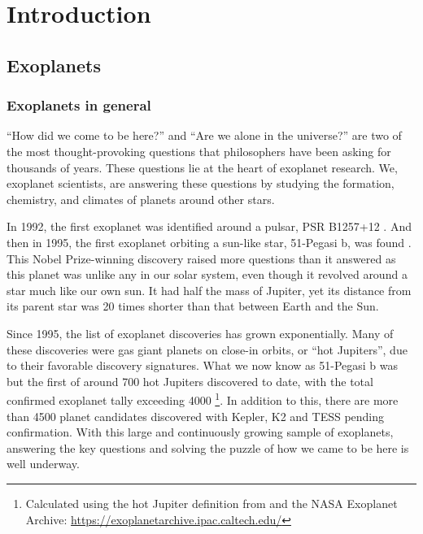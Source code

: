 \chapter{Introduction}
\label{ch:intro}

\graphicspath{{./gfx/fig_intro/}}


\section{Exoplanets}

\subsection{Exoplanets in general}

``How did we come to be here?'' and ``Are we alone in the universe?'' are two of the most thought-provoking questions that philosophers have been asking for thousands of years. These questions lie at the heart of exoplanet research. We, exoplanet scientists, are answering these questions by studying the formation, chemistry, and climates of planets around other stars.

In 1992, the first exoplanet was identified around a pulsar, PSR B1257+12 \citep{Wolszczan1992}. And then in 1995, the first exoplanet orbiting a sun-like star, 51-Pegasi b, was found \citep{Mayor1995}. This Nobel Prize-winning discovery raised more questions than it answered as this planet was  unlike any in our solar system, even though it revolved around  a star much like our own sun. It had half the mass of Jupiter, yet its distance from its parent star was 20 times shorter than that between Earth and the Sun.

Since 1995, the list of exoplanet discoveries has grown exponentially. Many of these discoveries were gas giant planets on close-in orbits, or ``hot Jupiters'', due to their favorable discovery signatures. What we now know as 51-Pegasi b was but the first of around 700 hot Jupiters discovered to date, with the total confirmed exoplanet tally exceeding 4000 \footnote{Calculated using the hot Jupiter definition from \citet{Winn2010} and the NASA Exoplanet Archive: \href{https://exoplanetarchive.ipac.caltech.edu/}{https://exoplanetarchive.ipac.caltech.edu/}}. In addition to this, there are more than 4500 planet candidates discovered with Kepler, K2 and TESS pending confirmation. With this large and continuously growing sample of exoplanets, answering the key questions and solving the puzzle of how we came to be here is well underway.

